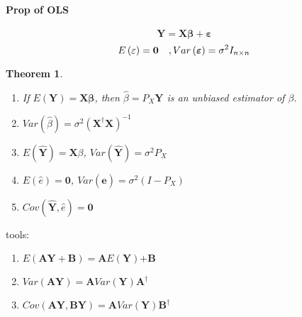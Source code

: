 \documentclass{article}
\newtheorem{theorem}{Theorem}
\begin{document}
\bigskip

\paragraph{Prop of OLS}

\begin{equation*}
\mathbf{Y=X\beta +\varepsilon }
\end{equation*}%
\begin{equation*}
E\left( \varepsilon \right) =\boldsymbol{0\quad },Var\left( \mathbf{%
\varepsilon }\right) =\sigma ^{2}I_{n\times n}
\end{equation*}

\begin{theorem}
\begin{enumerate}
\item If $E\left( \mathbf{Y}\right) =\mathbf{X\beta }$, then $\hat{\beta}%
=P_{X}\mathbf{Y}$ is an unbiased estimator of $\beta $.

\item $Var\left( \hat{\beta}\right) =\sigma ^{2}\left( \mathbf{X}^{\dagger }%
\mathbf{X}\right) ^{-1}$

\item $E\left( \mathbf{\hat{Y}}\right) =\mathbf{X}\beta $, $Var\left( 
\mathbf{\hat{Y}}\right) =\sigma ^{2}P_{X}$

\item $E\left( \hat{e}\right) =\boldsymbol{0}$, $Var\left( \mathbf{\hat{e}}%
\right) =\sigma ^{2}\left( I-P_{X}\right) $

\item $Cov\left( \mathbf{\hat{Y},}\hat{e}\right) =\boldsymbol{0}$
\end{enumerate}
\end{theorem}

\bigskip

tools:

\begin{enumerate}
\item $E\left( \mathbf{AY+B}\right) =\mathbf{A}E\left( \mathbf{Y}\right) 
\mathbf{+B}$

\item $Var\left( \mathbf{AY}\right) =\mathbf{A}Var\left( \mathbf{Y}\right) 
\mathbf{A}^{\dagger }$

\item $Cov\left( \mathbf{AY,BY}\right) =\mathbf{A}Var\left( \mathbf{Y}%
\right) \mathbf{B}^{\dagger }$
\end{enumerate}
\end{document}
